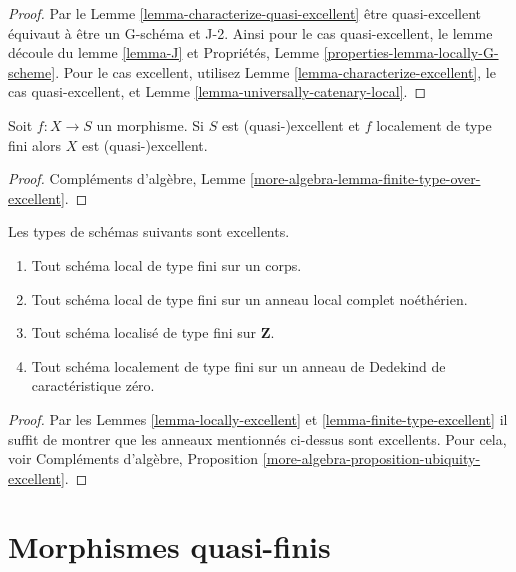 \begin{proof}
Par le Lemme \ref{lemma-characterize-quasi-excellent} être quasi-excellent
équivaut à être un G-schéma et J-2. Ainsi
pour le cas quasi-excellent, le lemme
découle du lemme
\ref{lemma-J} et Propriétés, Lemme \ref{properties-lemma-locally-G-scheme}.
Pour le cas excellent, utilisez Lemme \ref{lemma-characterize-excellent},
le cas quasi-excellent, et Lemme \ref{lemma-universally-catenary-local}.
\end{proof}

\begin{lemma}
\label{lemma-finite-type-excellent}
Soit $f : X \to S$ un morphisme. Si $S$
est (quasi-)excellent et $f$ localement de type fini alors $X$
est (quasi-)excellent.
\end{lemma}

\begin{proof}
Compléments d'algèbre, Lemme \ref{more-algebra-lemma-finite-type-over-excellent}.
\end{proof}

\begin{lemma}
\label{lemma-ubiquity-excellent}
Les types de schémas suivants sont excellents.
\begin{enumerate}
\item Tout schéma local de type fini sur un corps.
\item Tout schéma local de type fini sur un anneau local complet noéthérien.
\item Tout schéma localisé de type fini sur $\mathbf{Z}$.
\item Tout schéma localement de type fini sur un anneau de Dedekind de
caractéristique zéro.
\end{enumerate}
\end{lemma}

\begin{proof}
Par les Lemmes \ref{lemma-locally-excellent} et \ref{lemma-finite-type-excellent} il suffit de montrer que
les anneaux mentionnés ci-dessus sont excellents.
Pour cela,
voir Compléments d'algèbre, Proposition \ref{more-algebra-proposition-ubiquity-excellent}.
\end{proof}






\section{Morphismes quasi-finis}
\label{section-quasi-finite}

